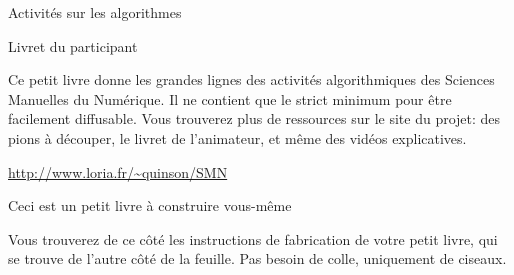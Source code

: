 \documentclass[a4paper,12pt]{article}
\begin{document}
\begin{center}
  {\Huge Activités sur les algorithmes}

  \bigskip
  {\Large Livret du participant}
  \vspace{-\baselineskip}
\end{center}

\large

Ce petit livre donne les grandes lignes des activités algorithmiques des
Sciences Manuelles du Numérique. Il ne contient que le strict minimum
pour être facilement diffusable. Vous trouverez plus de ressources sur
le site du projet: des pions à découper, le livret de l'animateur, et
même des vidéos explicatives.

\centerline{\color{blue}\url{http://www.loria.fr/~quinson/SMN}}

\bigskip\bigskip

\centerline{\Large Ceci est un petit livre à construire vous-même}


Vous trouverez de ce côté les instructions de fabrication de votre
petit livre, qui se trouve de l'autre côté de la feuille. Pas besoin
de colle, uniquement de ciseaux.

\bigskip\bigskip
\end{document}
